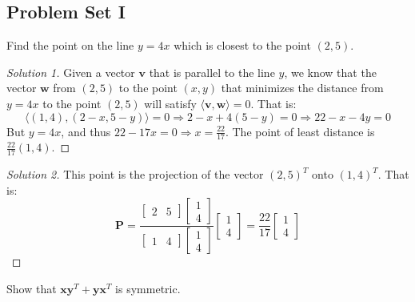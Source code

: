\documentclass[crop=false,class=book,oneside]{standalone}                      %
\begin{document}
        \subsection{Problem Set I}
        \begin{problem}
        Find the point on the line $y=4x$ which is closest to the point $(2,5)$.
        \end{problem}
        \begin{proof}[Solution 1]
        Given a vector $\mathbf{v}$ that is parallel to the line $y$, we know that the vector $\mathbf{w}$ from $(2,5)$ to the point $(x,y)$ that minimizes the distance from $y=4x$ to the point $(2,5)$ will satisfy $\langle \mathbf{v}, \mathbf{w}\rangle = 0$. That is:
        \begin{equation*}
            \big\langle (1,4), (2-x,5-y)\big\rangle = 0\Rightarrow 2-x+4(5-y) = 0 \Rightarrow 22 - x - 4 y = 0    
        \end{equation*}
        But $y = 4x$, and thus $22-17x = 0 \Rightarrow x= \frac{22}{17}$. The point of least distance is $\frac{22}{17}(1,4)$.
        \end{proof}
        \begin{proof}[Solution 2]
        This point is the projection of the vector $(2,5)^T$ onto $(1,4)^T$. That is:
        \begin{equation*}
            \mathbf{P} = \frac{\begin{bmatrix}2 & 5 \end{bmatrix} \begin{bmatrix} 1 \\ 4 \end{bmatrix}}{\begin{bmatrix} 1 & 4 \end{bmatrix} \begin{bmatrix} 1 \\ 4 \end{bmatrix}} \begin{bmatrix} 1 \\ 4 \end{bmatrix} = \frac{22}{17} \begin{bmatrix} 1 \\ 4\end{bmatrix}
        \end{equation*}
        \end{proof}
        \begin{problem}
        Show that $\mathbf{x}\mathbf{y}^T + \mathbf{y}\mathbf{x}^T$ is symmetric.
        \end{problem}
\end{document}
